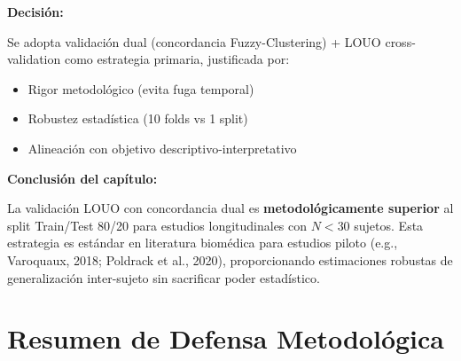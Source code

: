 \documentclass[12pt,letterpaper,twoside]{report}
\begin{document}
\begin{decisionbox}
\textbf{Decisión:}

Se adopta validación dual (concordancia Fuzzy-Clustering) + LOUO cross-validation como estrategia primaria, justificada por:
\begin{itemize}[noitemsep]
    \item Rigor metodológico (evita fuga temporal)
    \item Robustez estadística (10 folds vs 1 split)
    \item Alineación con objetivo descriptivo-interpretativo
\end{itemize}
\end{decisionbox}

\begin{conclusionbox}
\textbf{Conclusión del capítulo:}

La validación LOUO con concordancia dual es \textbf{metodológicamente superior} al split Train/Test 80/20 para estudios longitudinales con $N < 30$ sujetos. Esta estrategia es estándar en literatura biomédica para estudios piloto (e.g., Varoquaux, 2018; Poldrack et al., 2020), proporcionando estimaciones robustas de generalización inter-sujeto sin sacrificar poder estadístico.
\end{conclusionbox}

\section{Resumen de Defensa Metodológica}

\begin{table}[H]
\centering
\caption{Comparación de Estrategias de Validación}
\label{tab:validation_comparison}
\end{table}
\end{document}
